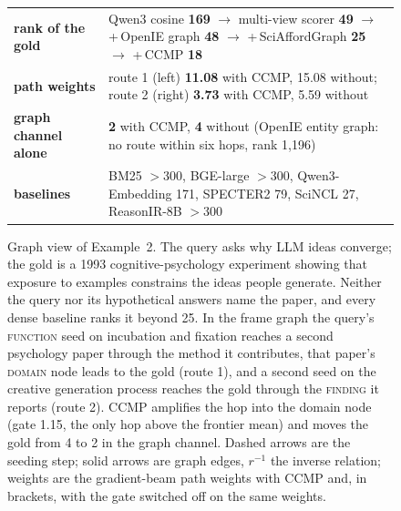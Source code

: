 \begin{figure}[H]

\vspace{4pt}
{\footnotesize
\begin{tabular}{@{}l l@{}}
\textbf{rank of the gold} & Qwen3 cosine \textbf{169} $\rightarrow$ multi-view scorer \textbf{49} $\rightarrow$ {+}\,OpenIE graph \textbf{48} $\rightarrow$ {+}\,SciAffordGraph \textbf{25} $\rightarrow$ {+}\,CCMP \textbf{18} \\
\textbf{path weights} & route 1 (left) \textbf{11.08} with CCMP, 15.08 without;\; route 2 (right) \textbf{3.73} with CCMP, 5.59 without \\
\textbf{graph channel alone} & \textbf{2} with CCMP, \textbf{4} without \quad (OpenIE entity graph: no route within six hops, rank 1{,}196) \\
\textbf{baselines} & BM25 $>$300, BGE-large $>$300, Qwen3-Embedding 171, SPECTER2 79, SciNCL 27, ReasonIR-8B $>$300 \\
\end{tabular}}
\caption{Graph view of Example~2. The query asks why LLM ideas converge; the gold is a 1993 cognitive-psychology
experiment showing that exposure to examples constrains the ideas people generate. Neither the query nor its
hypothetical answers name the paper, and every dense baseline ranks it beyond 25. In the frame graph the query's
\textsc{function} seed on incubation and fixation reaches a second psychology paper through the method it
contributes, that paper's \textsc{domain} node leads to the gold (route 1), and a second seed on the creative
generation process reaches the gold through the \textsc{finding} it reports (route 2). CCMP amplifies the hop into
the domain node (gate 1.15, the only hop above the frontier mean) and moves the gold from 4 to 2 in the graph
channel. Dashed arrows are the seeding step; solid arrows are graph edges, $r^{-1}$ the inverse relation; weights
are the gradient-beam path weights with CCMP and, in brackets, with the gate switched off on the same weights.}
\label{fig:graph-cs-2}
\end{figure}

